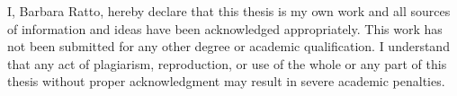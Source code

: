 \begin{originality}

I, Barbara Ratto, hereby declare that this thesis is my own work and all sources of information and ideas have been acknowledged appropriately. This work has not been submitted for any other degree or academic qualification. I understand that any act of plagiarism, reproduction, or use of the whole or any part of this thesis without proper acknowledgment may result in severe academic penalties.
\end{originality}